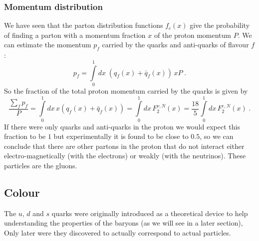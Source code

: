 \documentclass[12pt]{article}
\begin{document}
\subsubsection{Momentum distribution} 
We have seen that the parton distribution functions $f_c(x)$ give the probability of finding a parton with a momentum fraction $x$ of the proton momentum $P$. We can estimate the momentum $p_f$ carried by the quarks and anti-quarks of flavour $f$:
\[p_f=\int\limits_0^1dx\;\left(q_f(x)+\bar q_f(x)\right)\,xP\;.\]
So the fraction of the total proton momentum carried by the quarks is given by
\[\frac{\sum_f p_f}{P}=\int\limits_0^1 dx\, x \left(q_f(x)+\bar q_f(x)\right)=\int\limits_0^1 dx\, F_2^{\nu,N}(x)=\frac{18}{5} \int\limits_0^1 dx\,F_2^{e,N}(x)\;.\]   
If there were only quarks and anti-quarks in the proton we would expect this fraction to be $1$ but experimentally it is found to be close to $0.5$, so we can conclude that there are other partons in the proton that do not interact either electro-magnetically (with the electrons) or weakly (with the neutrinos). These particles are the gluons.   
%
%
\subsection{Colour}
%
%
The $u$, $d$ and $s$ quarks were originally introduced as a theoretical device to help understanding the properties of the baryons (as we will see in a later section), Only later were they discovered to actually correspond to actual particles. 
\end{document}
